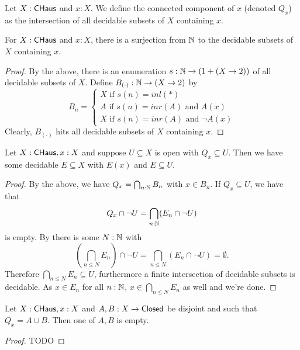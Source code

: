 \begin{definition}
  Let $X:\mathsf{CHaus}$ and $x:X$. 
  We define the connected component of $x$ (denoted $Q_x$)
  as the intersection of all decidable subsets of $X$ containing $x$. 
\end{definition}

\begin{corollary}
  For $X:\mathsf{CHaus}$ and $x:X$, there is a surjection from $\mathbb{N}$ to the decidable subsets of $X$ containing $x$. 
\end{corollary}
\begin{proof}
  By the above, %
  there is an enumeration $s: \mathbb{N} \to (1 + (X \to 2))$ of all decidable subsets of $X$. 
  Define $B_{(\cdot)}:\mathbb{N} \to (X \to 2)$ by 
  $$B_n = \begin{cases}
    X \text { if } s(n) = inl(*) \\
    A \text { if } s(n) = inr(A) \text { and } A(x) \\
    X \text { if } s(n) = inr(A) \text { and } \neg A(x)
  \end{cases}
  $$
  Clearly, $B_{(\cdot)}$ hits all decidable subsets of $X$ containing $x$. 
\end{proof}

\begin{lemma}\label{ConnectedComponentSubOpenHasDecidableInbetween}
  Let $X:\mathsf{CHaus}, x:X$ and suppose $U\subseteq X$ is open with $Q_x\subseteq U$. 
  Then we have some decidable $E\subseteq X$ with $E(x)$ and $E\subseteq U$. 
\end{lemma}
\begin{proof}
  By the above, we have $Q_x = \bigcap_{n:\mathbb{N}}B_n$ with $x\in B_n$. 
  If $Q_x \subseteq U$, we have that 
  $$Q_x\cap \neg U = \bigcap_{n:\mathbb{N}} (E_n \cap \neg U)$$ is empty. 
  By  there is some $N:\mathbb{N}$ with 
  $$(\bigcap_{n\leq N} E_n )\cap \neg U  = \bigcap_{n\leq N} (E_n \cap \neg U) = \emptyset.$$
  Therefore $\bigcap_{n\leq N} E_n \subseteq U$, furthermore a finite intersection of decidable subsets is decidable. 
  As $x\in E_n$ for all $n:\mathbb{N}$, $x\in \bigcap_{n\leq N} E_n$ as well and we're done. 
\end{proof}

\begin{lemma}
Let $X:\mathsf{CHaus}, x:X$ and $A,B:X \to \mathsf{Closed}$ be disjoint and such that $Q_x = A \cup B$. 
Then one of $A,B$ is empty. 
\end{lemma} 
\begin{proof}
TODO
\end{proof}

